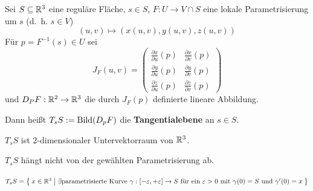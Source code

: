 \begin{definition}%
    Sei $S \subseteq \mathbb{R}^3$ eine reguläre Fläche, $s \in S$,
    $F: U \rightarrow V \cap S$ eine lokale Parametrisierung um $s$
    (d.~h. $s \in V$)
    \[(u,v) \mapsto (x(u,v), y(u,v), z(u,v))\]
    Für $p=F^{-1}(s) \in U$ sei
    \[        J_F(u,v) = \begin{pmatrix}
            \frac{\partial x}{\partial u} (p) & \frac{\partial x}{\partial v} (p)\\
            \frac{\partial y}{\partial u} (p) & \frac{\partial y}{\partial v} (p)\\
            \frac{\partial z}{\partial u} (p) & \frac{\partial z}{\partial v} (p)
        \end{pmatrix}\]
    und $D_P F: \mathbb{R}^2 \rightarrow \mathbb{R}^3$ die durch $J_F (p)$
    definierte lineare Abbildung.

    Dann heißt $T_s S := \operatorname{Bild}(D_p F)$ die \textbf{Tangentialebene}
    an $s \in S$.
\end{definition}

\begin{bemerkung}%
    $T_s S$ ist $2$-dimensionaler Untervektorraum von $\mathbb{R}^3$.
\end{bemerkung}

\begin{bemerkung}%
    $T_s S$ hängt nicht von der gewählten Parametrisierung ab.
\end{bemerkung}

\begin{beweis}\leavevmode
    \begin{behauptung}
        $T_s S = \Set{x \in \ensuremath{\mathbb{R}}^3 | \exists \text{parametrisierte Kurve } \gamma:[- \varepsilon, + \varepsilon] \rightarrow S \text{ für ein } \varepsilon > 0 \text{ mit } \gamma(0) = S \text{ und } \gamma'(0) = x}$
    \end{behauptung}
\end{beweis}

